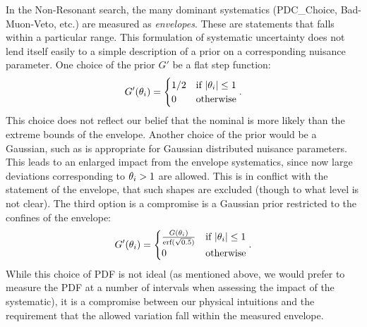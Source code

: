 In the Non-Resonant search, the many dominant systematics (PDC\_Choice, Bad-Muon-Veto, etc.) are measured as \emph{envelopes}. These are statements that \truthdata falls within a particular range. This formulation of systematic uncertainty does not lend itself easily to a simple description of a prior on a corresponding nuisance parameter. One choice of the prior $G'$ be a flat step function:
\begin{equation*}
    G'(\theta_i)=
\begin{cases}
    1/2             & \text{if }|\theta_i|\le1 \\
    0               & \text{otherwise}
\end{cases}.
\end{equation*}
This choice does not reflect our belief that the nominal \mc is more likely than the extreme bounds of the envelope. Another choice of the prior would be a Gaussian, such as is appropriate for Gaussian distributed nuisance parameters. This leads to an enlarged impact from the envelope systematics, since now large deviations corresponding to $\theta_i>1$ are allowed. This is in conflict with the statement of the envelope, that such shapes are excluded (though to what level is not clear). The third option is a compromise is a Gaussian prior restricted to the confines of the envelope:
\begin{equation*}
    G'(\theta_i)=
\begin{cases}
    \frac{G(\theta_i)}{\text{erf}(\sqrt{0.5})}            & \text{if }|\theta_i|\le1 \\
    0                                                & \text{otherwise}
\end{cases}.
\end{equation*}
While this choice of PDF is not ideal (as mentioned above, we would prefer to measure the PDF at a number of intervals when assessing the impact of the systematic), it is a compromise between our physical intuitions and the requirement that the allowed variation fall within the measured envelope.

